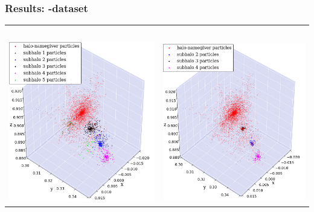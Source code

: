 \begin{frame}
	\frametitle{Results: \cosmo-dataset}
	
	\begin{tabular}{c c}
		\simple\ 	& \neigh \\[1.5em]
		{\includegraphics[width = .49\textwidth]{../report/images/cosmo/cos-halo-66858-nosaddle.png}}	& 
		{\includegraphics[width = .49\textwidth]{../report/images/cosmo/cos-halo-66858-saddle.png}}
	\end{tabular}
\end{frame}



